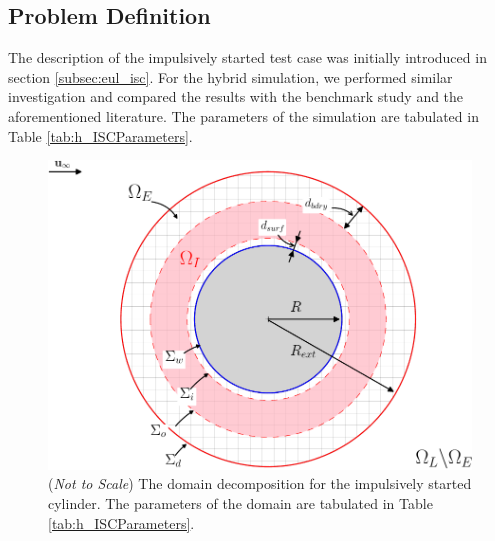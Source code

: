%
%

\subsection{Problem Definition}

The description of the impulsively started test case was initially introduced in section \ref{subsec:eul_isc}. For the hybrid simulation, we performed similar investigation and compared the results with the benchmark study and the aforementioned literature. The parameters of the simulation are tabulated in Table \ref{tab:h_ISCParameters}. 

	\begin{figure}[!b]
	\centering
	\includegraphics[width=0.6\linewidth]{./figures/validation/isc/hisc_dd-crop.pdf}
	\caption{(\textit{Not to Scale}) The domain decomposition for the impulsively started cylinder. The parameters of the domain are tabulated in Table \ref{tab:h_ISCParameters}.}
	\label{fig:hisc_dd}
	\end{figure}

